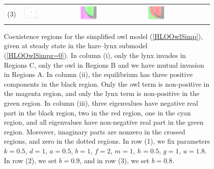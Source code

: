 \documentclass[12pt]{UOthesis}
\theoremstyle{remarkstyle}
\begin{document}
\begin{figure}[h!]
\begin{tabular}{m{0.07cm} m{4.5cm}  m{4.5cm}  m{4.5cm}}
		(3) & \includegraphics[width=0.33\textwidth]{HLOOwlSimpSSMutualInvasion3.png} & \includegraphics[width=0.33\textwidth]{HLOOwlSimpSSSteadyState3.png} & \includegraphics[width=0.33\textwidth]{HLOOwlSimpSSEigenvalues3.png}\\
	\end{tabular}
	\caption[Regions for the simplified owl model (steady state)]{Coexistence regions for the simplified owl model (\ref{HLOOwlSimp}), given at steady state in the hare--lynx submodel (\ref{HLOOwlSimpz=0}). In column (i), only the lynx invades in Regions C, only the owl in Regions B and we have mutual invasion in Regions A. In column (ii), the equilibrium has three positive components in the black region. Only the owl term is non-positive in the magenta region, and only the lynx term is non-positive in the green region. In column (iii), three eigenvalues have negative real part in the black region, two in the red region, one in the cyan region, and all eigenvalues have non-negative real part in the green region. Moreover, imaginary parts are nonzero in the crossed regions, and zero in the dotted regions. In row (1), we fix parameters $k=0.5$, $d=1$, $a=0.5$, $b=1$, $f=2$, $m=1$, $h=0.5$, $g=1$, $u=1.8$. In row (2), we set $b=0.9$, and in row (3), we set $b=0.8$.\label{HLOOwlSimpSSPlots}}%
\end{figure}
\end{document}
